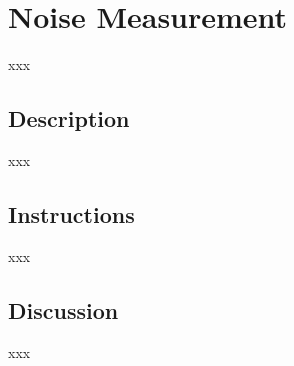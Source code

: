 \section{Noise Measurement}
xxx
\subsection{Description}
xxx
\subsection{Instructions}
xxx
\subsection{Discussion}
xxx
